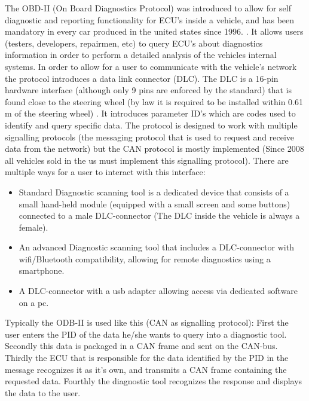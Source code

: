 \documentclass[11pt]{article}
\begin{document}
The OBD-II (On Board Diagnostics Protocol) was introduced to allow for self diagnostic and reporting functionality for ECU's inside a vehicle, and has been mandatory in every car produced in the united states since 1996. \cite{ODBwiki}. It allows users (testers, developers, repairmen, etc) to query ECU's about diagnostics information in order to perform a detailed analysis of the vehicles internal systems. In order to allow for a user to communicate with the vehicle's network the protocol introduces a data link connector (DLC). The DLC is a 16-pin hardware interface (although only 9 pins are enforced by the standard) that is found close to the steering wheel (by law it is required to be installed within 0.61 m of the steering wheel) \cite{ODBwiki}. It introduces parameter ID's which are codes used to identify and query specific data. The protocol is designed to work with multiple signalling protocols (the messaging protocol that is used to request and receive data from the network) but the CAN protocol is mostly implemented (Since 2008 all vehicles sold in the us must implement this signalling protocol). \newline
\newline
There are multiple ways for a user to interact with this interface:
\begin{itemize}
	\item Standard Diagnostic scanning tool is a dedicated device that consists of a small hand-held module (equipped with a small screen and some buttons) connected to a male DLC-connector (The DLC inside the vehicle is always a female).
	
	\item An advanced Diagnostic scanning tool that includes a DLC-connector with wifi/Bluetooth compatibility, allowing for remote diagnostics using a smartphone.
	
	\item A DLC-connector with a usb adapter allowing access via dedicated software on a pc. 
\end{itemize}

Typically the ODB-II is used like this (CAN as signalling protocol): First the user enters the PID of the data he/she wants to query into a diagnostic tool. Secondly this data is packaged in a CAN frame and sent on the CAN-bus. Thirdly the ECU that is responsible for the data identified by the PID in the message recognizes it as it's own, and transmits a CAN frame containing the requested data. Fourthly the diagnostic tool recognizes the response and displays the data to the user. \cite{PIDwiki}
\end{document}
